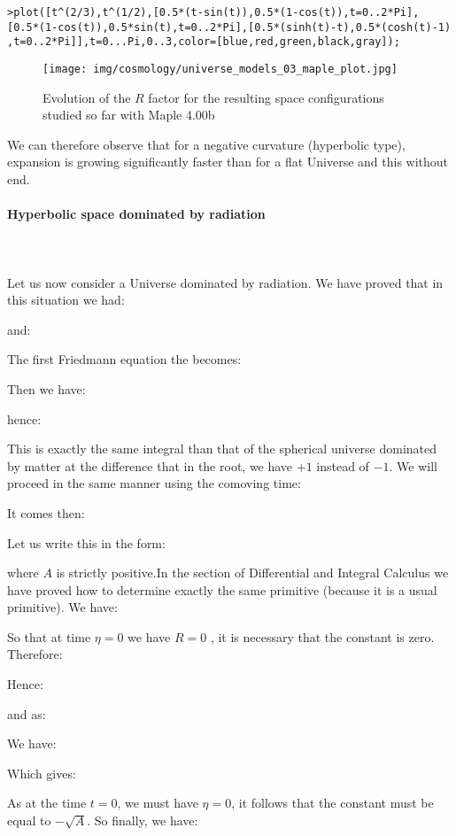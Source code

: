 	\texttt{>plot([t\string^(2/3),t\string^(1/2),[0.5*(t-sin(t)),0.5*(1-cos(t)),t=0..2*Pi],}\\
	\texttt{[0.5*(1-cos(t)),0.5*sin(t),t=0..2*Pi],[0.5*(sinh(t)-t),0.5*(cosh(t)-1)}
	\texttt{,t=0..2*Pi]],t=0...Pi,0..3,color=[blue,red,green,black,gray]);}
	\begin{figure}[H]
		\centering
		\texttt{[image: img/cosmology/universe\_models\_03\_maple\_plot.jpg]}
		\caption[]{Evolution of the $R$ factor for the resulting space configurations studied so far with Maple 4.00b}
	\end{figure}
	We can therefore observe that for a negative curvature (hyperbolic type), expansion is growing significantly faster than for a flat Universe and this without end.
	
	\paragraph{Hyperbolic space dominated by radiation}\mbox{}\\\\
	Let us now consider a Universe dominated by radiation. We have proved that in this situation we had:
	
	and:
	
	The first Friedmann equation the becomes:
	
	Then we have:
	
	hence:
	
	This is exactly the same integral than that of the spherical universe dominated by matter at the difference that in the root, we have $+1$ instead of $-1$. We will proceed in the same manner using the comoving time:
	
	It comes then:
	
	Let us write this in the form:
	
	where $A$ is strictly positive.In the section of Differential and Integral Calculus we have proved how to determine exactly the same primitive (because it is a usual primitive). We have:
	
	So that at time $\eta=0$ we have $R=0$ , it is necessary that the constant is zero. Therefore:
	
	Hence:
	
	and as:
	
	We have:
	
	Which gives:
	
	As at the time $t=0$, we must have $\eta=0$, it follows that the constant must be equal to $-\sqrt{A}$. So finally, we have:
	
